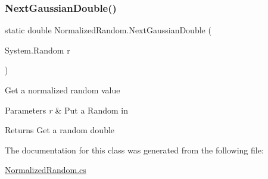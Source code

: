 \subsubsection{\texorpdfstring{NextGaussianDouble()}{NextGaussianDouble()}}
{\footnotesize\ttfamily static double Normalized\+Random.\+Next\+Gaussian\+Double (\begin{DoxyParamCaption}\item[{System.\+Random}]{r }\end{DoxyParamCaption})\hspace{0.3cm}{\ttfamily [static]}}



Get a normalized random value 


\begin{DoxyParams}{Parameters}
{\em r} & Put a Random in\\
\hline
\end{DoxyParams}
\begin{DoxyReturn}{Returns}
Get a random double
\end{DoxyReturn}


The documentation for this class was generated from the following file\+:\begin{DoxyCompactItemize}
\item 
\mbox{\hyperlink{_normalized_random_8cs}{Normalized\+Random.\+cs}}\end{DoxyCompactItemize}
